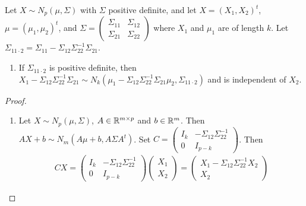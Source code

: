 \begin{theorem}
    Let $X \sim N_{p}(\mu,\Sigma)$ with $\Sigma$ positive definite, and let $X = (X_{1},X_{2})^{t}$, $\mu = (\mu_{1},\mu_{2})^{t}$, and $\Sigma = \begin{pmatrix}
        \Sigma_{11} & \Sigma_{12} \\
        \Sigma_{21} & \Sigma_{22}
    \end{pmatrix}$ where $X_{1}$ and $\mu_{1}$ are of length $k$. Let $\Sigma_{11\cdot 2} = \Sigma_{11} - \Sigma_{12}\Sigma_{22}^{-1}\Sigma_{21}$.
    \begin{enumerate}
        \item If $\Sigma_{11\cdot 2}$ is positive definite, then $X_{1}-\Sigma_{12}\Sigma_{22}^{-1}\Sigma_{21} \sim N_{k}(\mu_{1}-\Sigma_{12}\Sigma_{22}^{-1}\Sigma_{21}\mu_{2},\Sigma_{11\cdot 2})$ and is independent of $X_{2}$.
    \end{enumerate}
\end{theorem}
\begin{proof}
    \begin{enumerate}
        \item Let $X \sim N_{p}(\mu,\Sigma)$, $A \in \mathbb{R}^{m \times p}$ and $b \in \mathbb{R}^{m}$. Then $AX+b \sim N_{m}(A\mu+b,A\Sigma A^{t})$. Set $C = \begin{pmatrix}
            I_{k} & -\Sigma_{12}\Sigma_{22}^{-1} \\
            0 & I_{p-k}
        \end{pmatrix}$. Then
        \begin{align}
            CX = \begin{pmatrix}
                I_{k} & -\Sigma_{12}\Sigma_{22}^{-1} \\
                0 & I_{p-k}
            \end{pmatrix} \begin{pmatrix}
                X_{1} \\
                X_{2}
            \end{pmatrix} = \begin{pmatrix}
                X_{1} - \Sigma_{12}\Sigma_{22}^{-1}X_{2} \\
                X_{2}
            \end{pmatrix}
        \end{align}
    \end{enumerate}
\end{proof}